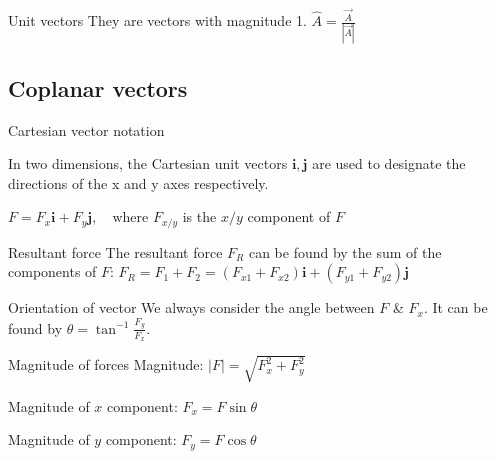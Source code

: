 \documentclass{article}
\begin{document}
\begin{knBox}[]{Unit vectors}
  They are vectors with magnitude 1. $\hat{A}=\frac{\vec{A}}{|\vec{A}|}$
\end{knBox}

\subsection{Coplanar vectors}
\begin{definition}
  {Cartesian vector notation}

  In two dimensions, the Cartesian unit vectors $\boldsymbol{i}, \boldsymbol{j}$ are used to designate the directions of the x and y axes respectively.

  $F=F_x \boldsymbol{i} + F_y \boldsymbol{j},\quad\text{where }F_{x/y}$ is the $x/y$ component of $F$
\end{definition}

\begin{knBox}
  {Resultant force}
  The resultant force $F_R$ can be found by the sum of the components of $F$: $F_R=F_1+F_2=(F_{x1}+F_{x2})\boldsymbol{i}+(F_{y1}+F_{y2})\boldsymbol{j}$
\end{knBox}
\begin{knBox}
  {Orientation of vector}
  We always consider the angle between $F$ \& $F_x$. It can be found by $\theta=\tan^{-1}\frac{F_y}{F_x}$.
\end{knBox}
\begin{knBox}
  {Magnitude of forces}
  Magnitude: $|F|=\sqrt{F_x^2+F_y^2}$

  Magnitude of $x$ component: $F_x=F\sin{\theta}$

  Magnitude of $y$ component: $F_y=F\cos{\theta}$
\end{knBox}
\end{document}
